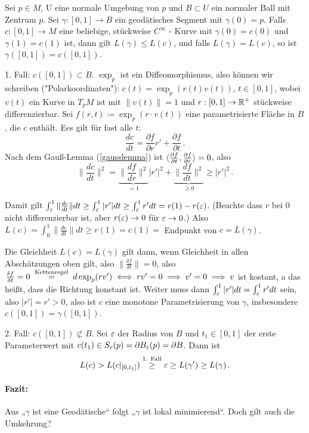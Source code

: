 \documentclass[a4paper,twoside,DIV15,BCOR12mm]{scrbook}
\renewcommand{\da}{\coloneqq}
\begin{document}
\begin{satz}
\label{geolokmin}
Sei $p \in M$, U eine normale Umgebung von $p$ und $B \subset U$ ein normaler Ball mit Zentrum $p$. Sei $\gamma: [0,1] \to B$ ein geodätisches Segment mit $\gamma(0)=p$. Falls $c:[0,1] \to M$ eine beliebige, stückweise $C^\infty$ - Kurve mit $\gamma(0)=c(0)$ und $\gamma(1)=c(1)$ ist, dann gilt $L(\gamma) \le L(c)$, und falls $L(\gamma)=L(c)$, so ist $\gamma([0,1]) = c([0,1])$.
\end{satz}
\begin{beweis}
1. Fall: $c([0,1]) \subset B$. $\exp_p$ ist ein Diffeomorphismus, also können wir schreiben ("Polarkoordinaten"):
$c(t)=\exp_p(r(t)v(t))$, $t \in [0,1]$, wobei $v(t)$ ein Kurve in $T_pM$  ist mit $\|v(t)\|=1$ und $r:[0,1] \to \mathbb{R}^+$ stückweise differenzierbar. Sei $f(r,t) \da \exp_p(r\cdot v(t))$ eine parametrisierte Fläche in $B$, die $c$ enthält. Ees gilt für fast alle $t$: 
\[ \frac{dc}{dt}=\frac{\partial f}{\partial r}r' + \frac{\partial f}{\partial t}\,.
\]
Nach dem Gauß-Lemma (\ref{gausslemma}) ist $\langle\frac{\partial f}{\partial t},\frac{\partial f}{\partial r}\rangle = 0$, also 
\[
\|\frac{dc}{dt}\|^2 = \underbrace{\|\frac{df}{dr}\|^2}_{=1} |r'|^2 + \underbrace{\|\frac{df}{dt}\|^2}_{\ge 0} \ge |r'|^2\,.
\]

Damit gilt $\int_\varepsilon^1 \|\frac{dc}{dt}\| dt \ge \int_\varepsilon^1|r'|dt \ge \int_\varepsilon^1r'dt = r(1) - r(\varepsilon)$. (Beachte dass $r$ bei 0 nicht differenzierbar ist, aber $r(\varepsilon) \to 0$ für $\varepsilon \to 0$.) Also $L(c) = \int_0^1\|\frac{dc}{dt}\| dt \ge r(1) = c(1) = $ Endpunkt von $c = L(\gamma)$.

Die Gleichheit $L(c) = L(\gamma)$ gilt dann, wenn Gleichheit in allen Abschätzungen oben gilt, also $\|\frac{\delta f}{\delta t}\| = 0$, also $\frac{\delta f}{\delta t} = 0 \gleichnach{Kettenregel} d\exp_p(rv') \gdw rv'= 0\folgt v'=0 \folgt v$ ist kostant, a das heißt, dass die Richtung konstant ist. Weiter muss dann $\int_\varepsilon^1 |r'|dt = \int_\varepsilon^1 r' dt$ sein, also $|r'| = r' >0$, also ist $c$ eine monotone Parametrisierung von $\gamma$, insbesondere $c([0,1]) = \gamma([0,1])$.

2. Fall: $c([0,1]) \not\subset B$. Sei $\varepsilon$ der Radius von $B$ und $t_1\in [0,1]$ der erste Parameterwert mit $c(t_1) \in S_\varepsilon(p) = \partial B_\varepsilon (p) = \partial B$. Dann ist
\[
L(c) > L(c|_{[0,t_1]}) \stackrel{\text{1. Fall}}\ge \varepsilon \ge L(\gamma') \ge L(\gamma)\,.
\]
\end{beweis}

\paragraph{Fazit:} Aus „$\gamma$ ist eine Geodätische“ folgt „$\gamma$ ist lokal minimierend“. Doch gilt auch die Umkehrung?
\end{document}
